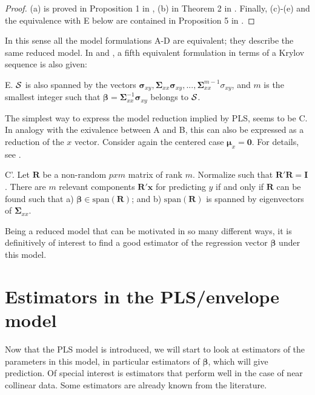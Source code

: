 \documentclass[num-refs]{wiley-article}
\begin{document}
\bigskip

\begin{proof}
(a) is proved in Proposition 1 in \citep{cook2013envelopes}, (b) in Theorem 2 in \citep{helland1990partial}. Finally, (c)-(e) and the equivalence with E below are contained in Proposition 5 in \citep{cook2013envelopes}.
\end{proof}
\bigskip

In this sense all the model formulations A-D are equivalent; they describe the same reduced model. In \citet{helland1990partial} and \citet{cook2013envelopes}, a fifth equivalent formulation in terms
of a Krylov sequence is also given:
\smallskip

E. $\cal{S}$ is also spanned by the vectors $ \bm{\sigma}_{xy}, \bm{\Sigma}_{xx}\bm{\sigma}_{xy},..., \bm{\Sigma}_{xx}^{m-1}\sigma_{xy}$, and $m$ is the smallest integer such that $\bm{\beta}=\bm{\Sigma}_{xx}^{-1}\bm{\sigma}_{xy}$ belongs to $\cal{S}$.

\smallskip

The simplest way to express the model reduction implied by PLS, seems to be C. In analogy with the exivalence between A and B, this can also be expressed as a reduction of the $x$ vector. Consider again the centered case $\bm{\mu}_x =\bm{0}$. For details, see \citep{naes1993relevant}.
\smallskip

C'. Let $\bm{R}$ be a non-random $pxm$ matrix of rank $m$. Normalize such that $\bm{R'R}=\bm{I}$. There are $m$ relevant components $\bm{R'x}$ for predicting $y$ if and only if $\bm{R}$ can be found such that a) $\bm{\beta}\in \mathrm{span}
(\bm{R})$; and b) $\mathrm{span}(\bm{R})$ is spanned by eigenvectors of $\bm{\Sigma}_{xx}$.
\smallskip

Being a reduced model that can be motivated in so many different ways, it is definitively of interest to find a good estimator of the regression vector $\bm{\beta}$ under this model.




\section{Estimators in the PLS/envelope model}

Now that the PLS model is introduced, we will start to look at estimators of the parameters in this model, in particular estimators of $\bm{\beta}$, which will give prediction. Of special interest is estimators that perform well in the case of near collinear data. Some estimators are already known from the literature.
\end{document}
